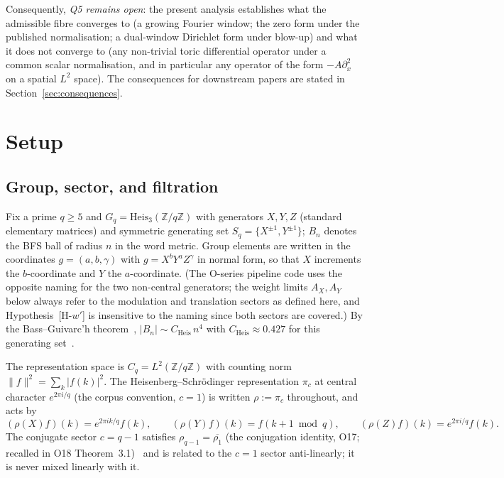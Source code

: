 \documentclass[11pt,a4paper]{article}
\theoremstyle{plain}
\theoremstyle{definition}
\theoremstyle{remark}
\newcommand{\Heis}{\mathrm{Heis}_3}
\newcommand{\Cq}{C_q}
\newcommand{\Gq}{G_q}
\newcommand{\Z}{\mathbb{Z}}
\newcommand{\CHeis}{C_{\mathrm{Heis}}}
\begin{document}
    Consequently, \emph{Q5 remains open}: the present analysis establishes what the admissible fibre
    converges to (a growing Fourier window; the zero form under the published normalisation; a
    dual-window Dirichlet form under blow-up) and what it does not converge to (any non-trivial toric
    differential operator under a common scalar normalisation, and in particular any operator of the
    form $-A\partial_x^2$ on a spatial $L^2$ space).
    The consequences for downstream papers are stated in Section~\ref{sec:consequences}.

  \section{Setup}
  \label{sec:setup}

  \subsection{Group, sector, and filtration}

    Fix a prime $q \ge 5$ and $\Gq = \Heis(\Z/q\Z)$ with generators $X, Y, Z$ (standard elementary
    matrices) and symmetric generating set $S_q = \{X^{\pm1}, Y^{\pm1}\}$; $B_n$ denotes the BFS ball
    of radius $n$ in the word metric.
    Group elements are written in the coordinates $g = (a, b, \gamma)$ with
    $g = X^{b} Y^{a} Z^{\gamma}$ in normal form, so that $X$ increments the $b$-coordinate and $Y$
    the $a$-coordinate.
    (The O-series pipeline code uses the opposite naming for the two non-central generators; the
    weight limits $A_X, A_Y$ below always refer to the modulation and translation sectors as defined
    here, and Hypothesis~[H-$w'$] is insensitive to the naming since both sectors are covered.)
    By the Bass--Guivarc'h theorem~\cite{Bass1972,Guivarch1973}, $|B_n| \sim \CHeis\, n^4$ with
    $\CHeis \approx 0.427$ for this generating set~\cite{Beau2026ccnote}.

    The representation space is $\Cq = L^2(\Z/q\Z)$ with counting norm $\|f\|^2 = \sum_k |f(k)|^2$.
    The Heisenberg--Schrödinger representation $\pi_c$ at central character $e^{2\pi i/q}$
    (the corpus convention, $c = 1$) is written $\rho := \pi_c$ throughout, and acts
    by
    \[
      (\rho(X) f)(k) = e^{2\pi i k/q} f(k), \qquad
      (\rho(Y) f)(k) = f(k+1 \bmod q), \qquad
      (\rho(Z) f)(k) = e^{2\pi i/q} f(k).
    \]
    The conjugate sector $c = q-1$ satisfies $\rho_{q-1} = \overline{\rho_1}$
    (the conjugation identity, O17; recalled in O18 Theorem~3.1)~\cite{Beau2026a21,Beau2026a22}
    and is related to the $c = 1$ sector anti-linearly; it is never mixed linearly with it.
\end{document}

